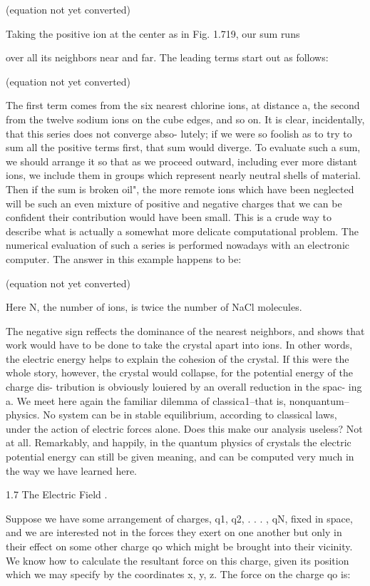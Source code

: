 (equation not yet converted)

Taking the positive ion at the center as in Fig. 1.719, our sum runs

over all its neighbors near and far. The leading terms start out as
follows:

(equation not yet converted)

The first term comes from the six nearest chlorine ions, at distance
a, the second from the twelve sodium ions on the cube edges, and so
on. It is clear, incidentally, that this series does not converge abso-
lutely; if we were so foolish as to try to sum all the positive terms
first, that sum would diverge. To evaluate such a sum, we should
arrange it so that as we proceed outward, including ever more distant
ions, we include them in groups which represent nearly neutral shells
of material. Then if the sum is broken oil", the more remote ions
which have been neglected will be such an even mixture of positive
and negative charges that we can be confident their contribution
would have been small. This is a crude way to describe what is
actually a somewhat more delicate computational problem. The
numerical evaluation of such a series is performed nowadays with an
electronic computer. The answer in this example happens to be:

(equation not yet converted)

Here N, the number of ions, is twice the number of NaCl molecules.

The negative sign reffects the dominance of the nearest neighbors,
and shows that work would have to be done to take the crystal apart
into ions. In other words, the electric energy helps to explain the
cohesion of the crystal. If this were the whole story, however, the
crystal would collapse, for the potential energy of the charge dis-
tribution is obviously louiered by an overall reduction in the spac-
ing a. We meet here again the familiar dilemma of classica1--that
is, nonquantum--physics. No system can be in stable equilibrium,
according to classical laws, under the action of electric forces alone.
Does this make our analysis useless? Not at all. Remarkably, and
happily, in the quantum physics of crystals the electric potential
energy can still be given meaning, and can be computed very much
in the way we have learned here.

1.7 The Electric Field .

Suppose we have some arrangement of charges, q1, q2, . . . , qN,
fixed in space, and we are interested not in the forces they exert on
one another but only in their effect on some other charge qo which
might be brought into their vicinity. We know how to calculate the
resultant force on this charge, given its position which we may specify
by the coordinates x, y, z. The force on the charge qo is:

